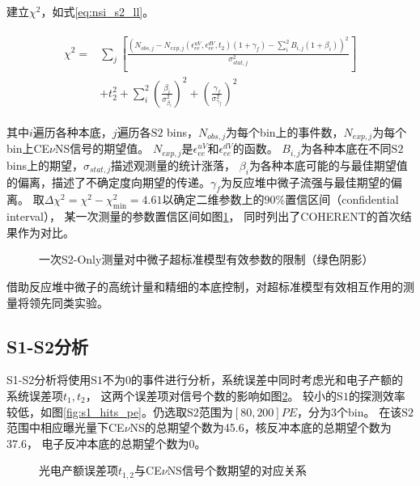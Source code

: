建立$\chi^2$，如式\ref{eq:nsi_s2_ll}。

\begin{align}
    \label{eq:nsi_s2_ll}
    \begin{split}
    \chi^2 =& \sum_j\left[\frac{\left(N_{obs,j} - N_{exp,j}(\epsilon^{uV}_{ee}, \epsilon^{dV}_{ee}, t_2)(1 + \gamma_f) 
    - \sum_{i}^2 B_{i,j}(1 + \beta_i)\right)^2}{\sigma^2_{stat,j}}\right] \\
    & + t_2^2 + \sum_{i}^2(\frac{\beta_i}{\sigma^2_{\beta_i}})^2 + (\frac{\gamma_f}{\sigma^2_{\gamma_f}})^2
    \end{split}
\end{align}

其中$i$遍历各种本底，$j$遍历各$\mathrm{S2}$ bins，$N_{obs,j}$为每个bin上的事件数，$N_{exp,j}$为每个bin上CE$\nu$NS信号的期望值。
$N_{exp,j}$是$\epsilon^{uV}_{ee}$和$\epsilon^{dV}_{ee}$的函数。
$B_{i,j}$为各种本底在不同$\mathrm{S2}$ bins上的期望，$\sigma_{stat,j}$描述观测量的统计涨落，
$\beta_i$为各种本底可能的与最佳期望值的偏离，描述了不确定度向期望的传递。$\gamma_f$为反应堆中微子流强与最佳期望的偏离。
取$\Delta \chi^2=\chi^2-\chi^2_\mathrm{min}=4.61$以确定二维参数上的90\%置信区间（confidential interval），
某一次测量的参数置信区间如图\ref{fig:nsi_sensitivity_s2only}，
同时列出了COHERENT的首次结果作为对比\cite{akimov_observation_2017}。

\begin{figure}
  \centering
  
  \caption{\label{fig:nsi_sensitivity_s2only} 一次S2-Only测量对中微子超标准模型有效参数的限制（绿色阴影）}
\end{figure}

借助反应堆中微子的高统计量和精细的本底控制，对超标准模型有效相互作用的测量将领先同类实验。

\subsection{S1-S2分析}

S1-S2分析将使用$\mathrm{S1}$不为0的事件进行分析，系统误差中同时考虑光和电子产额的系统误差项$t_1,t_2$，
这两个误差项对信号个数的影响如图\ref{fig:exp_s1s2_t1t2}。
较小的$\mathrm{S1}$的探测效率较低，如图\ref{fig:s1_hits_pe}。仍选取$\mathrm{S2}$范围为$[80, 200]\si{PE}$，分为3个bin。
在该$\mathrm{S2}$范围中相应曝光量下CE$\nu$NS的总期望个数为45.6，核反冲本底的总期望个数为37.6，
电子反冲本底的总期望个数为0。

\begin{figure}
  \centering
  
  \caption{\label{fig:exp_s1s2_t1t2} 光电产额误差项$t_{1,2}$与CE$\nu$NS信号个数期望的对应关系}
\end{figure}

